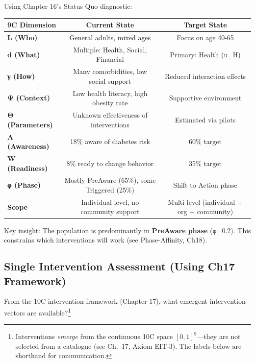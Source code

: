 Using Chapter 16's Status Quo diagnostic:

\begin{center}
\begin{tabular}{@{}lcc@{}}
\toprule
\textbf{9C Dimension} & \textbf{Current State} & \textbf{Target State} \\
\midrule
\textbf{L (Who)} & General adults, mixed ages & Focus on age 40-65 \\
\textbf{d (What)} & Multiple: Health, Social, Financial & Primary: Health (u\_H) \\
\textbf{γ (How)} & Many comorbidities, low social support & Reduced interaction effects \\
\textbf{Ψ (Context)} & Low health literacy, high obesity rate & Supportive environment \\
\textbf{Θ (Parameters)} & Unknown effectiveness of interventions & Estimated via pilots \\
\textbf{A (Awareness)} & 18\% aware of diabetes risk & 60\% target \\
\textbf{W (Readiness)} & 8\% ready to change behavior & 35\% target \\
\textbf{φ (Phase)} & Mostly PreAware (65\%), some Triggered (25\%) & Shift to Action phase \\
\textbf{Scope} & Individual level, no community support & Multi-level (individual + org + community) \\
\midrule
\end{tabular}
\end{center}

Key insight: The population is predominantly in \textbf{PreAware phase} (φ=0.2). This constrains which interventions will work (see Phase-Affinity, Ch18).

\subsection{Single Intervention Assessment (Using Ch17 Framework)}

From the 10C intervention framework (Chapter 17), what emergent intervention vectors are available?\footnote{Interventions \textit{emerge} from the continuous 10C space $[0,1]^9$---they are not selected from a catalogue (see Ch.~17, Axiom EIT-3). The labels below are shorthand for communication.}


